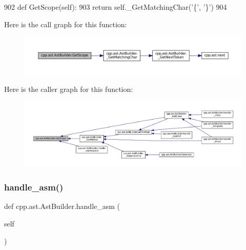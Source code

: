 \begin{DoxyCode}
902     \textcolor{keyword}{def }GetScope(self):
903         \textcolor{keywordflow}{return} self.\_GetMatchingChar(\textcolor{stringliteral}{'\{'}, \textcolor{stringliteral}{'\}'})
904 
\end{DoxyCode}
Here is the call graph for this function\+:
\nopagebreak
\begin{figure}[H]
\begin{center}
\leavevmode
\includegraphics[width=350pt]{classcpp_1_1ast_1_1AstBuilder_add6826421ce64546a7dbb9b2e699a4d4_cgraph}
\end{center}
\end{figure}
Here is the caller graph for this function\+:
\nopagebreak
\begin{figure}[H]
\begin{center}
\leavevmode
\includegraphics[width=350pt]{classcpp_1_1ast_1_1AstBuilder_add6826421ce64546a7dbb9b2e699a4d4_icgraph}
\end{center}
\end{figure}
\mbox{\label{classcpp_1_1ast_1_1AstBuilder_acf6ec42d567cd85a9bad77772c381a4e}} 
\subsubsection{\texorpdfstring{handle\+\_\+asm()}{handle\_asm()}}
{\footnotesize\ttfamily def cpp.\+ast.\+Ast\+Builder.\+handle\+\_\+asm (\begin{DoxyParamCaption}\item[{}]{self }\end{DoxyParamCaption})}



